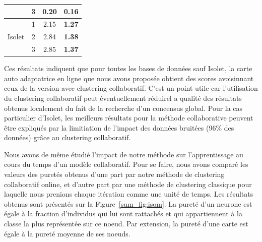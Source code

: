 \begin{table}[!h]
\begin{center}
\begin{tabular}{cccc}
                           & 3    & 0.20            & \textbf{0.16}                                                                  \\ \midrule
\multirow{3}{*}{Isolet}    & 1    & 2.15            & \textbf{1.27}                                                                  \\
                           & 2    & 2.84            & \textbf{1.38}                                                                  \\
                           & 3    & 2.85            & \textbf{1.37}                                                                 \\ \midrule
\end{tabular}
		\end{center}
\label{sum_tab:tab1}
	\end{table}

    Ces résultats indiquent que pour toutes les bases de données sauf Isolet, la carte auto adaptatrice en ligne que nous avons proposée obtient des scores avoisinnant ceux de la version avec clustering collaboratif. C'est un point utile car l'utilisation du clustering collaboratif peut éventuellement réduirel a qualité des résultats obtenus localement du fait de la recherche d'un concensus global. Pour la cas particulier d'Isolet, les meilleurs résultats pour la méthode collaborative peuvent être expliqués par la limitiation de l'impact des données bruitées (96\% des données) grâce au clustering collaboratif.

    Nous avons de même étudié l'impact de notre méthode sur l'apprentissage au cours du temps d'un modèle collaboratif. Pour se faire, nous avons comparé les valeurs des puretés obtenus d'une part par notre méthode de clustering collaboratif online, et d'autre part par une méthode de clustering classique pour laquelle nous prenions chaque itération comme une unité de temps. Les résultats obtenus sont présentés sur la Figure~\ref{sum_fig:isom}. La pureté d'un neurone est égale à la fraction d'individus qui lui sont rattachés et qui appartiennent à la classe la plus représentée sur ce noeud. Par extension, la pureté d'une carte est égale à la pureté moyenne de ses noeuds.

